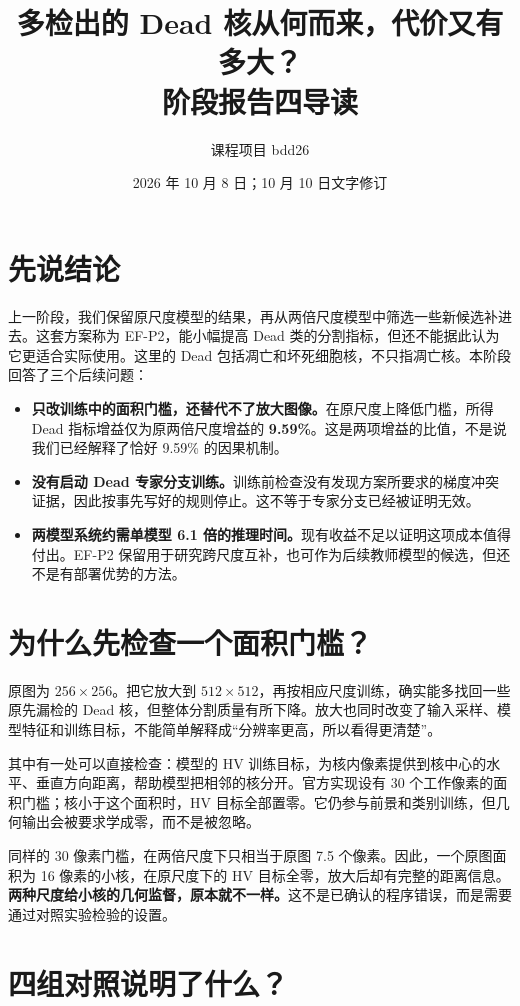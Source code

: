 \documentclass[12pt,a4paper]{article}
\title{\bfseries 多检出的 Dead 核从何而来，代价又有多大？\\[7pt]
\large 阶段报告四导读}
\author{课程项目 bdd26}
\date{2026 年 10 月 8 日；10 月 10 日文字修订}
\begin{document}
\maketitle

\section*{先说结论}

上一阶段，我们保留原尺度模型的结果，再从两倍尺度模型中筛选一些新候选补进去。这套方案称为 EF-P2，能小幅提高 Dead 类的分割指标，但还不能据此认为它更适合实际使用。这里的 Dead 包括凋亡和坏死细胞核，不只指凋亡核。本阶段回答了三个后续问题：

\begin{itemize}
\item \textbf{只改训练中的面积门槛，还替代不了放大图像。}在原尺度上降低门槛，所得 Dead 指标增益仅为原两倍尺度增益的 \textbf{9.59\%}。这是两项增益的比值，不是说我们已经解释了恰好 9.59\% 的因果机制。
\item \textbf{没有启动 Dead 专家分支训练。}训练前检查没有发现方案所要求的梯度冲突证据，因此按事先写好的规则停止。这不等于专家分支已经被证明无效。
\item \textbf{两模型系统约需单模型 6.1 倍的推理时间。}现有收益不足以证明这项成本值得付出。EF-P2 保留用于研究跨尺度互补，也可作为后续教师模型的候选，但还不是有部署优势的方法。
\end{itemize}

\section*{为什么先检查一个面积门槛？}

原图为 $256\times256$。把它放大到 $512\times512$，再按相应尺度训练，确实能多找回一些原先漏检的 Dead 核，但整体分割质量有所下降。放大也同时改变了输入采样、模型特征和训练目标，不能简单解释成“分辨率更高，所以看得更清楚”。

其中有一处可以直接检查：模型的 HV 训练目标，为核内像素提供到核中心的水平、垂直方向距离，帮助模型把相邻的核分开。官方实现设有 30 个工作像素的面积门槛；核小于这个面积时，HV 目标全部置零。它仍参与前景和类别训练，但几何输出会被要求学成零，而不是被忽略。

同样的 30 像素门槛，在两倍尺度下只相当于原图 7.5 个像素。因此，一个原图面积为 16 像素的小核，在原尺度下的 HV 目标全零，放大后却有完整的距离信息。\textbf{两种尺度给小核的几何监督，原本就不一样。}这不是已确认的程序错误，而是需要通过对照实验检验的设置。

\section*{四组对照说明了什么？}
\end{document}
